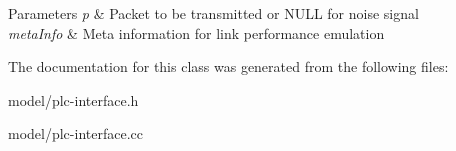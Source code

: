 \begin{DoxyParams}{\-Parameters}
{\em p} & \-Packet to be transmitted or \-N\-U\-L\-L for noise signal \\
\hline
{\em meta\-Info} & \-Meta information for link performance emulation \\
\hline
\end{DoxyParams}


\-The documentation for this class was generated from the following files\-:\begin{DoxyCompactItemize}
\item 
model/plc-\/interface.\-h\item 
model/plc-\/interface.\-cc\end{DoxyCompactItemize}
